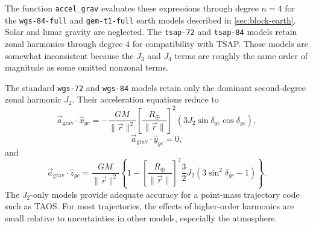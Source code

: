 The function \texttt{accel\_grav} evaluates these expressions through degree
$n=4$ for the \texttt{wgs-84-full} and \texttt{gem-t1-full} earth models described
in \cref{sec:block-earth}. Solar and lunar gravity are neglected. The
\texttt{tsap-72} and \texttt{tsap-84} models retain zonal harmonics through degree
4 for compatibility with TSAP. Those models are somewhat inconsistent because the
$J_3$ and $J_4$ terms are roughly the same order of magnitude as some omitted
nonzonal terms.

The standard \texttt{wgs-72} and \texttt{wgs-84} models retain only the dominant
second-degree zonal harmonic $J_2$. Their acceleration equations reduce to
\begin{equation}
  \vec a_{\mathrm{grav}}\mathbin{\cdot}\hat x_{gc}
  =-\frac{GM}{\lVert\vec r\rVert^2}
    \left[\frac{R_{\oplus}}{\lVert\vec r\rVert}\right]^2
    \left(3J_2\sin\delta_{gc}\cos\delta_{gc}\right),
  \label{eq:gravity-j2-geocentric-x}
\end{equation}
\begin{equation}
  \vec a_{\mathrm{grav}}\mathbin{\cdot}\hat y_{gc}=0,
  \label{eq:gravity-j2-geocentric-y}
\end{equation}
and
\begin{equation}
  \vec a_{\mathrm{grav}}\mathbin{\cdot}\hat z_{gc}
  =\frac{GM}{\lVert\vec r\rVert^2}
   \left\{1-
    \left[\frac{R_{\oplus}}{\lVert\vec r\rVert}\right]^2
    \frac{3}{2}J_2\left(3\sin^2\delta_{gc}-1\right)
   \right\}.
  \label{eq:gravity-j2-geocentric-z}
\end{equation}
The $J_2$-only models provide adequate accuracy for a point-mass trajectory code
such as TAOS. For most trajectories, the effects of higher-order harmonics are small
relative to uncertainties in other models, especially the atmosphere.
